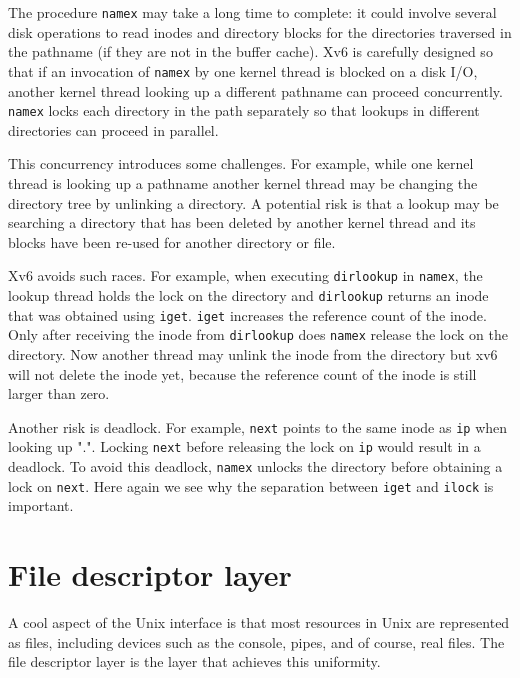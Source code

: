 The procedure
\lstinline{namex}
may take a long time to complete: it could involve several disk operations to
read inodes and directory blocks for the directories traversed in the pathname
(if they are not in the buffer cache).  Xv6 is carefully designed so that if an
invocation of
\lstinline{namex}
by one kernel thread is blocked on a disk I/O, another kernel thread looking up
a different pathname can proceed concurrently.
\lstinline{namex}
locks each directory in the path separately so that lookups in different
directories can proceed in parallel.

This concurrency introduces some challenges. For example, while one kernel
thread is looking up a pathname another kernel thread may be changing the
directory tree by unlinking a directory.  A potential risk is that a lookup
may be searching a directory that has been deleted by another kernel thread and
its blocks have been re-used for another directory or file.

Xv6 avoids such races.  For example, when executing
\lstinline{dirlookup}
in
\lstinline{namex},
the lookup thread holds the lock on the directory and
\lstinline{dirlookup}
returns an inode that was obtained using
\lstinline{iget}.
\lstinline{iget}
increases the reference count of the inode.  Only after receiving the
inode from
\lstinline{dirlookup}
does
\lstinline{namex}
release the lock on the directory.  Now another thread may unlink the inode from
the directory but xv6 will not delete the inode yet, because the reference count
of the inode is still larger than zero.

Another risk is deadlock.  For example,
\lstinline{next}
points to the same inode as
\lstinline{ip}
when looking up ".".
Locking
\lstinline{next}
before releasing the lock on
\lstinline{ip}
would result in a deadlock.
To avoid this deadlock,
\lstinline{namex}
unlocks the directory before obtaining a lock on
\lstinline{next}.
Here again we see why the separation between
\lstinline{iget}
and
\lstinline{ilock}
is important.
\section{File descriptor layer}

A cool aspect of the Unix interface is that most resources in Unix are
represented as files, including devices such as the console, pipes, and of
course, real files.  The file descriptor layer is the layer that achieves this
uniformity.

